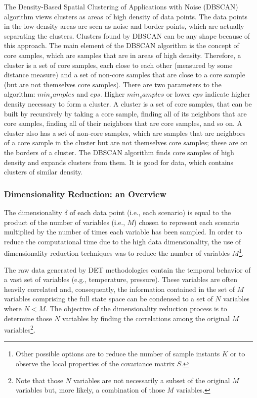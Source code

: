 The Density-Based Spatial Clustering of Applications with Noise (DBSCAN) algorithm views clusters as areas of high density of data points. The data points in the low-density areas are seen as noise and border points, which are actually separating the clusters. Clusters found by DBSCAN can be any shape because of this approach. 
The main element of the DBSCAN algorithm is the concept of core samples, which are samples that are in areas of high density. Therefore, a cluster is a set of core samples, each close to each other (measured by some distance measure) and a set of non-core samples that are close to a core sample (but are not themselves core samples). There are two parameters to the algorithm: $min_samples$ and $eps$. Higher $min_samples$ or lower $eps$ indicate higher density necessary to form a cluster. 
A cluster is a set of core samples, that can be built by recursively by taking a core sample, finding all of its neighbors that are core samples, finding all of their neighbors that are core samples, and so on. A cluster also has a set of non-core samples, which are samples that are neighbors of a core sample in the cluster but are not themselves core samples; these are on the borders of a cluster. 
The DBSCAN algorithm finds core samples of high density and expands clusters from them. It is good for data, which contains clusters of similar density. 

\subsubsection{Dimensionality Reduction: an Overview}
\label{sec:6DimRed.section}

The dimensionality $\delta$ of each data point (i.e., each scenario) is equal to the product of the number of variables (i.e., $M$) chosen to represent each scenario multiplied by the number of times each variable has been sampled.
In order to reduce the computational time due to the high data dimensionality, the use of dimensionality reduction techniques was to reduce the number of variables $M$\footnote{Other possible options are to reduce the number of sample instants $K$ or to observe the local properties of the covariance matrix $S$.}.

The raw data generated by DET methodologies contain the temporal behavior of a vast set of variables (e.g., temperature, pressure). These variables are often heavily correlated and, consequently, the information contained in the set of $M$ variables comprising the full state space can be condensed to a set of $N$ variables where $N <M$. The objective of the dimensionality reduction process is to determine those $N$ variables by finding the correlations among the original $M$ variables\footnote{Note that those $N$ variables are not necessarily a subset of the original $M$ variables but, more likely, a combination of those $M$ variables.}.


